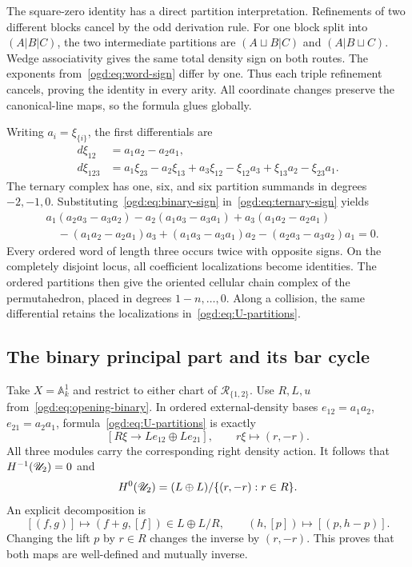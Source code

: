 The square-zero identity has a direct partition interpretation.
Refinements of two different blocks cancel by the odd derivation rule.
For one block split into \((A|B|C)\), the two intermediate partitions are \((A\sqcup B|C)\) and \((A|B\sqcup C)\).
Wedge associativity gives the same total density sign on both routes.
The exponents from~\eqref{ogd:eq:word-sign} differ by one.
Thus each triple refinement cancels, proving the identity in every arity.
All coordinate changes preserve the canonical-line maps, so the formula glues globally.

Writing \(a_i=\xi_{\{i\}}\), the first differentials are
\begin{align}
 d\xi_{12}&=a_1a_2-a_2a_1,\label{ogd:eq:binary-sign}\\
 d\xi_{123}&=a_1\xi_{23}-a_2\xi_{13}+a_3\xi_{12}
              -\xi_{12}a_3+\xi_{13}a_2-\xi_{23}a_1.\label{ogd:eq:ternary-sign}
\end{align}
The ternary complex has one, six, and six partition summands in degrees \(-2,-1,0\).
Substituting~\eqref{ogd:eq:binary-sign} in~\eqref{ogd:eq:ternary-sign} yields
\begin{align*}
 &a_1(a_2a_3-a_3a_2)-a_2(a_1a_3-a_3a_1)+a_3(a_1a_2-a_2a_1)\\
 &\quad -(a_1a_2-a_2a_1)a_3+(a_1a_3-a_3a_1)a_2
              -(a_2a_3-a_3a_2)a_1=0.
\end{align*}
Every ordered word of length three occurs twice with opposite signs.
On the completely disjoint locus, all coefficient localizations become identities.
The ordered partitions then give the oriented cellular chain complex of the permutahedron, placed in degrees \(1-n,\ldots,0\).
Along a collision, the same differential retains the localizations in~\eqref{ogd:eq:U-partitions}.

\subsection{The binary principal part and its bar cycle}

Take \(X=\mathbb A^1_k\) and restrict to either chart of \(\mathscr R_{\{1,2\}}\).
Use \(R,L,u\) from~\eqref{ogd:eq:opening-binary}.
In ordered external-density bases \(e_{12}=a_1a_2\), \(e_{21}=a_2a_1\), formula~\eqref{ogd:eq:U-partitions} is exactly
\[
 [R\xi\longrightarrow Le_{12}\oplus Le_{21}],\qquad r\xi\longmapsto(r,-r).
\]
All three modules carry the corresponding right density action.
It follows that \(H^{-1}(\mathscr U_2)=0\) and
\[
 H^0(\mathscr U_2)=(L\oplus L)/\{(r,-r):r\in R\}.
\]
An explicit decomposition is
\begin{equation}\label{ogd:eq:binary-split}
 [(f,g)]\longmapsto(f+g,[f])\in L\oplus L/R,
 \qquad
 (h,[p])\longmapsto[(p,h-p)].
\end{equation}
Changing the lift \(p\) by \(r\in R\) changes the inverse by \((r,-r)\).
This proves that both maps are well-defined and mutually inverse.

